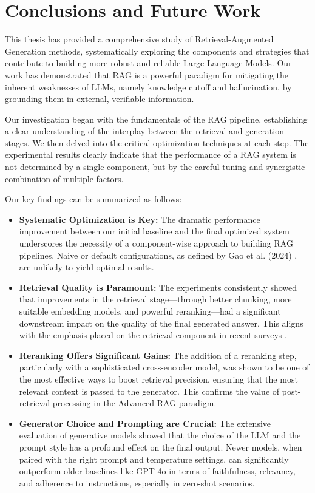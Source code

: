 \chapter{Conclusions and Future Work}
\label{chap:conclusions}

This thesis has provided a comprehensive study of Retrieval-Augmented Generation methods, systematically exploring the components and strategies that contribute to building more robust and reliable Large Language Models. Our work has demonstrated that RAG is a powerful paradigm for mitigating the inherent weaknesses of LLMs, namely knowledge cutoff and hallucination, by grounding them in external, verifiable information.

Our investigation began with the fundamentals of the RAG pipeline, establishing a clear understanding of the interplay between the retrieval and generation stages. We then delved into the critical optimization techniques at each step. The experimental results clearly indicate that the performance of a RAG system is not determined by a single component, but by the careful tuning and synergistic combination of multiple factors. 

Our key findings can be summarized as follows:
\begin{itemize}
    \item \textbf{Systematic Optimization is Key:} The dramatic performance improvement between our initial baseline and the final optimized system underscores the necessity of a component-wise approach to building RAG pipelines. Naive or default configurations, as defined by Gao et al. (2024) \autocite{gao2024retrievalaugmented}, are unlikely to yield optimal results.
    \item \textbf{Retrieval Quality is Paramount:} The experiments consistently showed that improvements in the retrieval stage—through better chunking, more suitable embedding models, and powerful reranking—had a significant downstream impact on the quality of the final generated answer. This aligns with the emphasis placed on the retrieval component in recent surveys \autocite{gao2024retrievalaugmented}.
    \item \textbf{Reranking Offers Significant Gains:} The addition of a reranking step, particularly with a sophisticated cross-encoder model, was shown to be one of the most effective ways to boost retrieval precision, ensuring that the most relevant context is passed to the generator. This confirms the value of post-retrieval processing in the Advanced RAG paradigm.
    \item \textbf{Generator Choice and Prompting are Crucial:} The extensive evaluation of generative models showed that the choice of the LLM and the prompt style has a profound effect on the final output. Newer models, when paired with the right prompt and temperature settings, can significantly outperform older baselines like GPT-4o in terms of faithfulness, relevancy, and adherence to instructions, especially in zero-shot scenarios.
\end{itemize}

